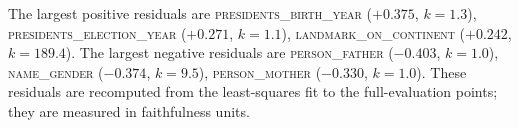 The largest positive residuals are \textsc{presidents\_birth\_year} ($+0.375$, $k=1.3$), \textsc{presidents\_election\_year} ($+0.271$, $k=1.1$), \textsc{landmark\_on\_continent} ($+0.242$, $k=189.4$). The largest negative residuals are \textsc{person\_father} ($-0.403$, $k=1.0$), \textsc{name\_gender} ($-0.374$, $k=9.5$), \textsc{person\_mother} ($-0.330$, $k=1.0$). These residuals are recomputed from the least-squares fit to the full-evaluation points; they are measured in faithfulness units.
